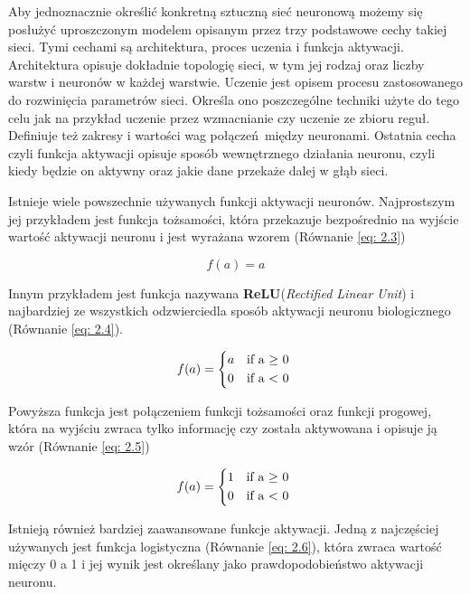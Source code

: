\documentclass[12pt, oneside, a4paper]{report}
\begin{document}
Aby jednoznacznie określić konkretną sztuczną sieć neuronową możemy się posłużyć uproszczonym modelem opisanym przez trzy podstawowe cechy takiej sieci. Tymi cechami są architektura, proces uczenia i funkcja aktywacji. Architektura opisuje dokładnie topologię sieci, w tym jej rodzaj oraz liczby warstw i neuronów w każdej warstwie. Uczenie jest opisem procesu zastosowanego do rozwinięcia parametrów sieci. Określa ono poszczególne techniki użyte do tego celu jak na przykład uczenie przez wzmacnianie czy uczenie ze zbioru reguł. Definiuje też zakresy i wartości wag połączeń między neuronami. Ostatnia cecha czyli funkcja aktywacji opisuje sposób wewnętrznego działania neuronu, czyli kiedy będzie on aktywny oraz jakie dane przekaże dalej w głąb sieci.

Istnieje wiele powszechnie używanych funkcji aktywacji neuronów. Najprostszym jej przykładem jest funkcja tożsamości, która przekazuje bezpośrednio na wyjście wartość aktywacji neuronu i jest wyrażana wzorem (Równanie \ref{eq: 2.3})

\begin{equation}\label{eq: 2.3}
  f(a) = a
\end{equation}

Innym przykładem jest funkcja nazywana \textbf{ReLU}(\textit{Rectified Linear Unit}) i najbardziej ze wszystkich odzwierciedla sposób aktywacji neuronu biologicznego (Równanie \ref{eq: 2.4}).

\begin{equation}\label{eq: 2.4}
    f(a) =
    \begin{cases*}
      a & if a $\geq$ 0 \\
      0 & if a < 0
    \end{cases*}
\end{equation}

Powyższa funkcja jest połączeniem funkcji tożsamości oraz funkcji progowej, która na wyjściu zwraca tylko informację czy została aktywowana i opisuje ją wzór (Równanie \ref{eq: 2.5})

\begin{equation}\label{eq: 2.5}
  f(a) =
  \begin{cases*}
    1 & if a $\geq$ 0 \\
    0 & if a < 0
  \end{cases*}
\end{equation}

Istnieją również bardziej zaawansowane funkcje aktywacji. Jedną z najczęściej używanych jest funkcja logistyczna (Równanie \ref{eq: 2.6}), która zwraca wartość mięczy 0 a 1 i jej wynik jest określany jako prawdopodobieństwo aktywacji neuronu.
\end{document}

